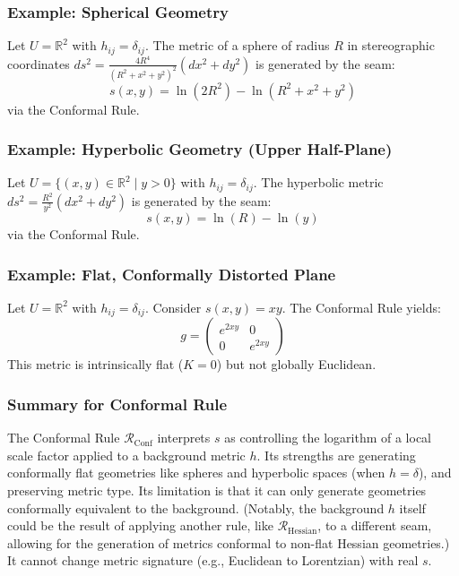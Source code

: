 \documentclass[twoside,twocolumn]{article}
\numberwithin{equation}{section} %
\begin{document}
\subsubsection{Example: Spherical Geometry}
Let $U = \mathbb{R}^2$ with $h_{ij} = \delta_{ij}$. The metric of a sphere of radius $R$ in stereographic coordinates $ds^2 = \frac{4R^4}{(R^2 + x^2 + y^2)^2}(dx^2 + dy^2)$ is generated by the seam:
$$ s(x, y) = \ln(2R^2) - \ln(R^2 + x^2 + y^2) $$
via the Conformal Rule.

\subsubsection{Example: Hyperbolic Geometry (Upper Half-Plane)}
Let $U = \{ (x, y) \in \mathbb{R}^2 \mid y > 0 \}$ with $h_{ij} = \delta_{ij}$. The hyperbolic metric $ds^2 = \frac{R^2}{y^2} (dx^2 + dy^2)$ is generated by the seam:
$$ s(x, y) = \ln(R) - \ln(y) $$
via the Conformal Rule.

\subsubsection{Example: Flat, Conformally Distorted Plane}
Let $U = \mathbb{R}^2$ with $h_{ij} = \delta_{ij}$. Consider $s(x, y) = xy$. The Conformal Rule yields:
$$ g = \begin{pmatrix} e^{2xy} & 0 \\ 0 & e^{2xy} \end{pmatrix} $$
This metric is intrinsically flat ($K=0$) but not globally Euclidean.

\subsubsection{Summary for Conformal Rule}
The Conformal Rule $\mathcal{R}_{\text{Conf}}$ interprets $s$ as controlling the logarithm of a local scale factor applied to a background metric $h$. Its strengths are generating conformally flat geometries like spheres and hyperbolic spaces (when $h=\delta$), and preserving metric type. Its limitation is that it can only generate geometries conformally equivalent to the background. (Notably, the background $h$ itself could be the result of applying another rule, like $\mathcal{R}_{\text{Hessian}}$, to a different seam, allowing for the generation of metrics conformal to non-flat Hessian geometries.) It cannot change metric signature (e.g., Euclidean to Lorentzian) with real $s$.

\end{document}
